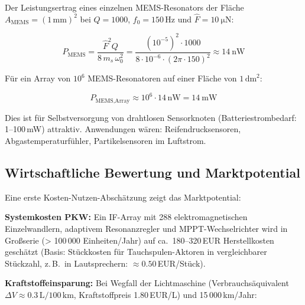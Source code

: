 ﻿\documentclass[12pt, a4paper]{report}
\theoremstyle{definition}
\theoremstyle{remark}
\begin{document}
Der Leistungsertrag eines einzelnen MEMS-Resonators der Fläche
$A_{\text{MEMS}} = (1\,\text{mm})^2$ bei $Q = 1000$, $f_0 = 150\,\text{Hz}$
und $\hat{F} = \SI{10}{\micro\newton}$:

\begin{equation}
  P_{\text{MEMS}} = \frac{\hat{F}^2 Q}{8\,m_s\,\omega_0^2}
  = \frac{(10^{-5})^2 \cdot 1000}{8 \cdot 10^{-6} \cdot (2\pi\cdot150)^2}
  \approx \SI{14}{\nano\watt}
  \label{eq:p_mems}
\end{equation}

Für ein Array von $10^6$ MEMS-Resonatoren auf einer Fläche von $1\,\text{dm}^2$:

\begin{equation}
  P_{\text{MEMS,Array}} \approx 10^6 \cdot 14\,\text{nW} = \SI{14}{\milli\watt}
  \label{eq:p_mems_array}
\end{equation}

Dies ist für Selbstversorgung von drahtlosen Sensor\-knoten
(Batteriestrom\-bedarf: 1--100\,mW) attraktiv. Anwendungen wären:
Reifendrucksensoren, Abgastemperaturfühler, Partikel\-sensoren im Luftstrom.

\subsection{Wirtschaftliche Bewertung und Marktpotential}
\label{ssec:ausblick_wirtschaft}

Eine erste Kosten-Nutzen-Abschätzung zeigt das Marktpotential:

\textbf{Systemkosten PKW:} Ein IF-Array mit 288 elektromagnetischen Einzel\-wandlern,
adaptivem Resonanzregler und MPPT-Wechselrichter wird in Groß\-serie
(> 100\,000 Einheiten/Jahr) auf ca.\ 180--320\,EUR Herstell\-kosten
geschätzt (Basis: Stückkosten für Tauchspulen-Aktoren in vergleichbarer
Stückzahl, z.\,B.\ in Lautsprechern: $\approx 0.50$\,EUR/Stück).

\textbf{Kraftstoffeinsparung:} Bei Wegfall der Lichtmaschine
(Verbrauchsäquivalent $\Delta V \approx 0.3\,\text{L}/100\,\text{km}$,
Kraftstoffpreis 1.80\,EUR/L) und 15\,000\,km/Jahr:
\end{document}
